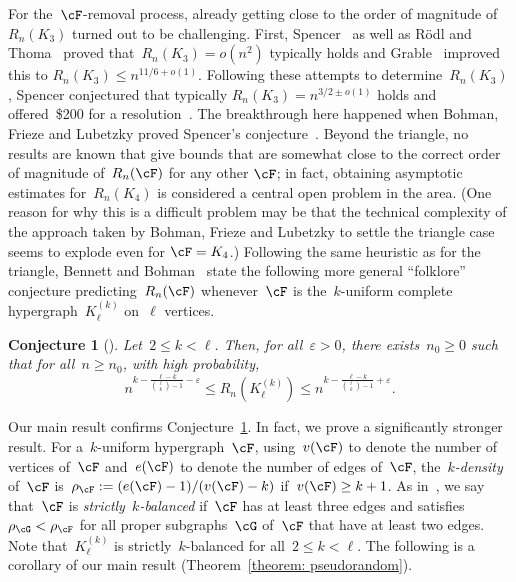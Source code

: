 \documentclass[11pt]{amsart}
\newcommand{\eps}{\varepsilon}
\newtheorem{conjecture}[algocf]{Conjecture}
\theoremstyle{definition}
\numberwithin{equation}{section}
\begin{document}
	For the~$\cF$-removal process, already getting close to the order of magnitude of~$R_n(K_3)$ turned out to be challenging.
	First, Spencer~\cite{S:95} as well as R\"odl and Thoma~\cite{RT:96} proved that~$R_n(K_3)=o(n^2)$ typically holds and Grable~\cite{G:97} improved this to $R_n(K_3)\leq n^{11/6+o(1)}$.
	Following these attempts to determine~$R_n(K_3)$, Spencer conjectured that typically $R_n(K_3)=n^{3/2\pm o(1)}$ holds and offered~\$200 for a resolution~\cite{G:97,W:99}.
	The breakthrough here happened when Bohman, Frieze and Lubetzky proved Spencer's conjecture~\cite{BFL:15}.
	Beyond the triangle, no results are known that give bounds that are somewhat close to the correct order of magnitude of~$R_n(\cF)$ for any other $\cF$;
	in fact, obtaining asymptotic estimates for~$R_n(K_4)$ is considered a central open problem in the area.
	(One reason for why this is a difficult problem may be that the technical complexity of the approach taken by Bohman, Frieze and Lubetzky to settle the triangle case seems to explode even for $\cF=K_4$.)
	Following the same heuristic as for the triangle, Bennett and Bohman~\cite{BB:19} state the following more general \enquote{folklore} conjecture predicting~$R_n(\cF)$ whenever~$\cF$ is the~$k$-uniform complete hypergraph~$K^{(k)}_\ell$ on~$\ell$ vertices.
	\begin{conjecture}[{\cite[Conjecture~1.2]{BB:19}}]\label{conjecture}
		Let~$2\leq k<\ell$.
		Then, for all~$\eps>0$, there exists~$n_0\geq 0$ such that for all~$n\geq n_0$, with high probability,
		\begin{equation*}
			n^{k-\frac{\ell-k}{\binom{\ell}{k}-1}-\eps}\leq R_n(K^{(k)}_\ell)\leq n^{k-\frac{\ell-k}{\binom{\ell}{k}-1}+\eps}.
		\end{equation*}
	\end{conjecture}
	
	Our main result confirms Conjecture~\ref{conjecture}.
	In fact, we prove a significantly stronger result.
	For a~$k$-uniform hypergraph~$\cF$, using~$v(\cF)$ to denote the number of vertices of~$\cF$ and~$e(\cF)$ to denote the number of edges of~$\cF$, the~\emph{$k$-density} of~$\cF$ is~$\rho_\cF:=(e(\cF)-1)/(v(\cF)-k)$ if~$v(\cF)\geq k+1$.
	As in~\cite{BK:10}, we say that~$\cF$ is \emph{strictly~$k$-balanced} if~$\cF$ has at least three edges and satisfies~$\rho_\cG<\rho_\cF$ for all proper subgraphs~$\cG$ of~$\cF$ that have at least two edges.
	Note that~$K_\ell^{(k)}$ is strictly~$k$-balanced for all~$2\leq k<\ell$.
	The following is a corollary of our main result (Theorem~\ref{theorem: pseudorandom}).
	 
\end{document}
